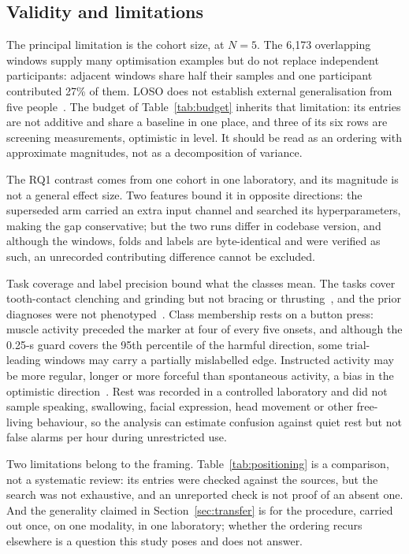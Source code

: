 \documentclass[pdflatex,sn-nature,iicol]{sn-jnl}
\begin{document}
\subsection{Validity and limitations}

The principal limitation is the cohort size, at $N=5$. The 6,173 overlapping windows supply many optimisation examples but do not replace independent participants: adjacent windows share half their samples and one participant contributed 27\% of them. LOSO does not establish external generalisation from five people~\cite{varoquaux2018cross}. The budget of Table~\ref{tab:budget} inherits that limitation: its entries are not additive and share a baseline in one place, and three of its six rows are screening measurements, optimistic in level. It should be read as an ordering with approximate magnitudes, not as a decomposition of variance.

The RQ1 contrast comes from one cohort in one laboratory, and its magnitude is not a general effect size. Two features bound it in opposite directions: the superseded arm carried an extra input channel and searched its hyperparameters, making the gap conservative; but the two runs differ in codebase version, and although the windows, folds and labels are byte-identical and were verified as such, an unrecorded contributing difference cannot be excluded.

Task coverage and label precision bound what the classes mean. The tasks cover tooth-contact clenching and grinding but not bracing or thrusting~\cite{verhoeff2025definitions}, and the prior diagnoses were not phenotyped~\cite{manfredini2024standardised}. Class membership rests on a button press: muscle activity preceded the marker at four of every five onsets, and although the 0.25-s guard covers the 95th percentile of the harmful direction, some trial-leading windows may carry a partially mislabelled edge. Instructed activity may be more regular, longer or more forceful than spontaneous activity, a bias in the optimistic direction~\cite{farella2008masticatory}. Rest was recorded in a controlled laboratory and did not sample speaking, swallowing, facial expression, head movement or other free-living behaviour, so the analysis can estimate confusion against quiet rest but not false alarms per hour during unrestricted use.

Two limitations belong to the framing. Table~\ref{tab:positioning} is a comparison, not a systematic review: its entries were checked against the sources, but the search was not exhaustive, and an unreported check is not proof of an absent one. And the generality claimed in Section~\ref{sec:transfer} is for the procedure, carried out once, on one modality, in one laboratory; whether the ordering recurs elsewhere is a question this study poses and does not answer.
\end{document}
